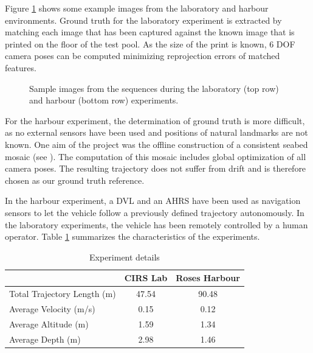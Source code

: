 \documentclass[conference]{IEEEtran}
\begin{document}

Figure \ref{sample-images} shows some example images from the laboratory and harbour environments. Ground truth for the laboratory experiment is extracted by matching each image that has been captured against the known image that is printed on the floor of the test pool. As the size of the print is known, 6 DOF camera poses can be computed minimizing reprojection errors of matched features.

\begin{figure}
  \noindent{}
  \caption{Sample images from the sequences during the laboratory (top row) and harbour (bottom row) experiments.}
  \label{sample-images}
\end{figure}

For the harbour experiment, the determination of ground truth is more difficult, as no external sensors have been used and positions of natural landmarks are not known. One aim of the project was the offline construction of a consistent seabed mosaic (see \cite{Ferrer2007}). The computation of this mosaic includes global optimization of all camera poses. The resulting trajectory does not suffer from drift and is therefore chosen as our ground truth reference.

In the harbour experiment, a DVL and an AHRS have been used as navigation sensors to let the vehicle follow a previously defined trajectory autonomously. In the laboratory experiments, the vehicle has been remotely controlled by a human operator. Table \ref{experiment-details} summarizes the characteristics of the experiments.

\begin{table}[!t]
  \renewcommand{\arraystretch}{1.3}
  \caption{Experiment details}
  \label{experiment-details}
  \centering
  \begin{tabular}{lcc}
    & \textbf{CIRS Lab} & \textbf{Roses Harbour}  \\ \hline
    Total Trajectory Length (m)     & 47.54 & 90.48  \\
    Average Velocity (m/s)          & 0.15 & 0.12  \\
    Average Altitude (m)            & 1.59 & 1.34  \\
    Average Depth (m)               & 2.98 & 1.46  \\
  \end{tabular}
\end{table}
\end{document}
